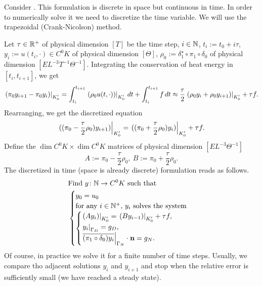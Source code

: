 \begin{discussion}
  Consider .
  This formulation is discrete in space but continuous in time.
  In order to numerically solve it we need to discretize the time variable.
  We will use the trapezoidal (Crank-Nicolson) method.

  Let
    $\tau \in \mathbb{R}^+$ of physical dimension $[T]$ be the time step,
    $i \in \mathbb{N}$,
    $t_i := t_0 + i \tau$,
    $y_i := u(t_i, \cdot) \in C^0 K$ of physical dimension $[\Theta]$,
    $\rho_0 := \delta_1^\star \circ \pi_1 \circ \delta_0$
      of physical dimension $[E L^{-3} T^{-1} \Theta^{-1}]$.
  Integrating the conservation of heat energy in $[t_i, t_{i + 1}]$, we get
  \begin{equation}
    \left. (\pi_0 y_{i + 1} - \pi_0 y_i) \right|_{K'_0}
    =   \int_{t_i}^{t_{i + 1}} \left. (\rho_0 u(t, \cdot)) \right|_{K'_0}\, d t
      + \int_{t_i}^{t_{i + 1}} f\, d t
    \approx
    \frac{\tau}{2} \left. (\rho_0 y_i + \rho_0 y_{i + 1}) \right|_{K'_0} + \tau f.
  \end{equation}
  Rearranging, we get the discretized equation
  \begin{equation}
    \left. ((\pi_0 - \frac{\tau}{2} \rho_0) y_{i + 1}) \right|_{K'_0}
    = \left. ((\pi_0 + \frac{\tau}{2} \rho_0) y_i) \right|_{K'_0} + \tau f.
  \end{equation}
  Define the $\dim C^0 K \times \dim C^0 K$ matrices of physical dimension
  $[E L^{-3} \Theta^{-1}]$
  \begin{equation}
    A := \pi_0 - \frac{\tau}{2} \rho_0,\ B := \pi_0 + \frac{\tau}{2} \rho_0.
  \end{equation}
  The discretized in time (space is already discrete) formulation reads as
  follows.
  \begin{equation}
    \begin{split}
      & \text{Find $y \colon \mathbb{N} \to C^0 K$ such that} \\
      &
      \begin{cases}
        y_0 = u_0 \\
        \text{for any $i \in \mathbb{N}^+$, $y_i$ solves the system} \\
        \begin{cases}
          \left. (A y_i) \right|_{K'_0} = \left. (B y_{i - 1}) \right|_{K'_0} + \tau f, \\
          \left. y_i \right|_{\Gamma_D} = g_D, \\
          \left. \overline{(\pi_1 \circ \delta_0) y_i} \right|_{\Gamma_N}
            \cdot {\bf n} = g_N.
        \end{cases}
      \end{cases}
    \end{split}
  \end{equation}
  Of course, in practice we solve it for a finite number of time steps.
  Usually, we compare tho adjacent solutions $y_i$ and $y_{i + 1}$ and stop when
  the relative error is sufficiently small (we have reached a steady state).
\end{discussion}
